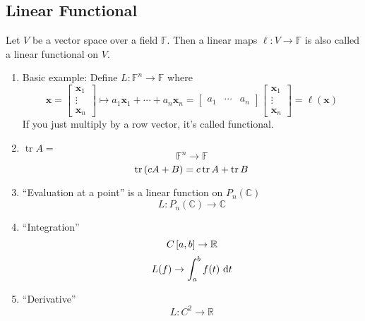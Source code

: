 \documentclass{article}
\DeclareMathOperator{\trace}{tr}
\newcommand{\m}[1]{\begin{bmatrix} #1 \end{bmatrix}}
\newcommand{\RR}{\mathbb{R}}
\newcommand{\CC}{\mathbb{C}}
\begin{document}
\subsection{Linear Functional}

Let \(V\) be a vector space over a field \(\mathbb{F}\).
Then a linear maps \(\ell : V \to \mathbb{F}\) is also called a linear functional on \(V\).

\begin{enumerate}
\item Basic example: Define \(L : \mathbb{F}^n \to \mathbb{F}\) where
  \[\bm x = \m{\bm x_1\\\vdots\\\bm x_n} \mapsto a_1 \bm x_1 + \cdots + a_n \bm x_n = \m{a_1 & \cdots & a_n}\m{\bm x_1\\\vdots\\\bm x_n} = \ell(\bm x)\]
  If you just multiply by a row vector, it's called functional.

\item \(\trace A = \)
  \[\mathbb{F}^n \to \mathbb{F}\]
  \[\trace\del{cA + B} = c\trace A + \trace B\]

\item ``Evaluation at a point''
  is a linear function on \(P_n(\CC)\)
  \[L:P_n(\CC) \to \CC\]

\item ``Integration''
  \[C\intcc{a, b} \to \RR\]
  \[L(f) \to \int_a^b f(t)\,\dif t\]


\item ``Derivative''
  \[L:C^2 \to \RR\]
\end{enumerate}
\end{document}
